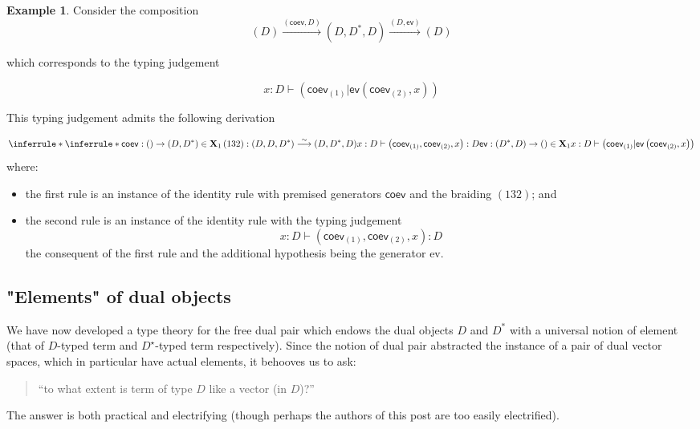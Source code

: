 \documentclass[pra,floatfix,
amsmath,superscriptaddress, 12pt]{article}
\theoremstyle{definition}
\newtheorem*{example}{Example}
\newcommand{\liso}{\overset{\sim}{\longrightarrow}}
\newcommand{\evmap}{\mathsf{ev}}
\newcommand{\coev}{\mathsf{coev}}
\begin{document}
\begin{example} Consider the composition
\[
    (D)\xrightarrow{(\coev,D)} (D,D^{*},D) \xrightarrow{(D,\evmap)} (D)
\]

%
%

which  corresponds to the typing judgement

\[
    x:D\vdash\left(\coev_{\left(1\right)}|\evmap\left(\coev_{\left(2\right)},x\right)\right)
\]

This typing judgement admits the following derivation

\[
\inferrule*{
    \inferrule*{
        \coev:() \rightarrow (D,D^*) \in \mathbf{X}_1
            \\
            \left(132\right):\left(D,D,D^{*}\right)\liso\left(D,D^{*},D\right)
    }{
        x:D\vdash\left(\coev_{\left(1\right)},\coev_{\left(2\right)},x\right):D
    }
        \\
        \evmap: (D^*,D) \rightarrow () \in \mathbf{X}_1
    }{
        x:D\vdash\left(\coev_{\left(1\right)}|\evmap\left(\coev_{\left(2\right)},x\right)\right)
    }
\]
where:
\begin{itemize}
    \item the first rule is an instance of the identity rule with premised generators $\coev$ and the braiding $(132)$; and
    \item the second rule is an instance of the identity rule with the typing judgement $$x:D\vdash\left(\coev_{\left(1\right)},\coev_{\left(2\right)},x\right):D$$ the consequent of the first rule and the additional hypothesis being the generator \textsf{ev}.  
\end{itemize} 
\end{example}
%




\subsection{"Elements" of dual objects}
We have now developed a type theory for the free dual pair which endows
the dual objects $D$ and $D^{*}$ with a universal notion of element (that of $D$-typed term and $D^\star$-typed term respectively).
Since the notion of dual pair abstracted the instance of a pair of
dual vector spaces, which in particular have actual elements, it behooves
us to ask:
\begin{quotation}
``to what extent is term of type $D$ like a vector (in $D$)?''
\end{quotation}
The answer is both practical and electrifying (though perhaps the
authors of this post are too easily electrified).
\end{document}
